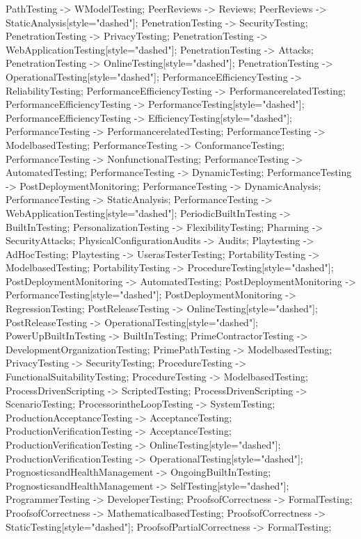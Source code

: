 \documentclass{article}
\begin{document}
{PathTesting -> WModelTesting;
PeerReviews -> Reviews;
PeerReviews -> StaticAnalysis[style="dashed"];
PenetrationTesting -> SecurityTesting;
PenetrationTesting -> PrivacyTesting;
PenetrationTesting -> WebApplicationTesting[style="dashed"];
PenetrationTesting -> Attacks;
PenetrationTesting -> OnlineTesting[style="dashed"];
PenetrationTesting -> OperationalTesting[style="dashed"];
PerformanceEfficiencyTesting -> ReliabilityTesting;
PerformanceEfficiencyTesting -> PerformancerelatedTesting;
PerformanceEfficiencyTesting -> PerformanceTesting[style="dashed"];
PerformanceEfficiencyTesting -> EfficiencyTesting[style="dashed"];
PerformanceTesting -> PerformancerelatedTesting;
PerformanceTesting -> ModelbasedTesting;
PerformanceTesting -> ConformanceTesting;
PerformanceTesting -> NonfunctionalTesting;
PerformanceTesting -> AutomatedTesting;
PerformanceTesting -> DynamicTesting;
PerformanceTesting -> PostDeploymentMonitoring;
PerformanceTesting -> DynamicAnalysis;
PerformanceTesting -> StaticAnalysis;
PerformanceTesting -> WebApplicationTesting[style="dashed"];
PeriodicBuiltInTesting -> BuiltInTesting;
PersonalizationTesting -> FlexibilityTesting;
Pharming -> SecurityAttacks;
PhysicalConfigurationAudits -> Audits;
Playtesting -> AdHocTesting;
Playtesting -> UserasTesterTesting;
PortabilityTesting -> ModelbasedTesting;
PortabilityTesting -> ProcedureTesting[style="dashed"];
PostDeploymentMonitoring -> AutomatedTesting;
PostDeploymentMonitoring -> PerformanceTesting[style="dashed"];
PostDeploymentMonitoring -> RegressionTesting;
PostReleaseTesting -> OnlineTesting[style="dashed"];
PostReleaseTesting -> OperationalTesting[style="dashed"];
PowerUpBuiltInTesting -> BuiltInTesting;
PrimeContractorTesting -> DevelopmentOrganizationTesting;
PrimePathTesting -> ModelbasedTesting;
PrivacyTesting -> SecurityTesting;
ProcedureTesting -> FunctionalSuitabilityTesting;
ProcedureTesting -> ModelbasedTesting;
ProcessDrivenScripting -> ScriptedTesting;
ProcessDrivenScripting -> ScenarioTesting;
ProcessorintheLoopTesting -> SystemTesting;
ProductionAcceptanceTesting -> AcceptanceTesting;
ProductionVerificationTesting -> AcceptanceTesting;
ProductionVerificationTesting -> OnlineTesting[style="dashed"];
ProductionVerificationTesting -> OperationalTesting[style="dashed"];
PrognosticsandHealthManagement -> OngoingBuiltInTesting;
PrognosticsandHealthManagement -> SelfTesting[style="dashed"];
ProgrammerTesting -> DeveloperTesting;
ProofsofCorrectness -> FormalTesting;
ProofsofCorrectness -> MathematicalbasedTesting;
ProofsofCorrectness -> StaticTesting[style="dashed"];
ProofsofPartialCorrectness -> FormalTesting;
}
\end{document}
